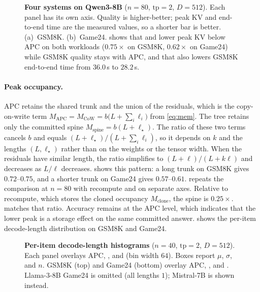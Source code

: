 \fi

\begin{figure}[t]
\centering
\resizebox{\columnwidth}{!}{}
\caption{\textbf{Four systems on Qwen3-8B} ($n{=}80$, $\mathrm{tp}{=}2$, $D{=}512$).
Each panel has its own axis. Quality is higher-better; peak KV and end-to-end time are the measured values, so a shorter bar is better.
(a)~GSM8K. (b)~Game24.
 shows that \sys and \plus lower peak KV below APC on both workloads ($0.75\times$ on GSM8K, $0.62\times$ on Game24) while GSM8K quality stays with APC, and that \plus also lowers GSM8K end-to-end time from $36.0$\,s to $28.2$\,s.}
\label{fig:eval-radar}
\end{figure}

\paragraph{Peak occupancy.}
APC retains the shared trunk and the union of the residuals, which is the copy-on-write term $M_{\mathrm{APC}}=M_{\mathrm{CoW}}=b\bigl(L+\sum_i\ell_i\bigr)$ from \eqref{eq:mem}. The tree retains only the committed spine $M_{\mathrm{spine}}=b(L+\ell_\star)$.
The ratio of these two terms cancels $b$ and equals $(L+\ell_\star)/(L+\sum_i\ell_i)$, so it depends on $k$ and the lengths $(L,\ell_\star)$ rather than on the weights or the tensor width.
When the residuals have similar length, the ratio simplifies to $(L+\ell)/(L+k\ell)$ and decreases as $L/\ell$ decreases.
 shows this pattern: a long trunk on GSM8K gives $0.72$--$0.75$, and a shorter trunk on Game24 gives $0.57$--$0.61$.
 repeats the comparison at $n{=}80$ with recompute and \plus on separate axes.
Relative to recompute, which stores the cloned occupancy $M_{\mathrm{clone}}$, the spine is $0.25\times$.
\plus matches that ratio.
Accuracy remains at the APC level, which indicates that the lower peak is a storage effect on the same committed answer.
 shows the per-item decode-length distribution on GSM8K and Game24.

\begin{figure}[t]
\centering
\resizebox{\textwidth}{!}{}
\caption{\textbf{Per-item decode-length histograms} ($n{=}40$, $\mathrm{tp}{=}2$, $D{=}512$).
Each panel overlays APC, \sys, and \plus (bin width $64$).
Boxes report $\mu$, $\sigma$, and $n$.
GSM8K (top) and Game24 (bottom) overlay APC, \sys, and \plus.
Llama-3-8B Game24 is omitted (all lengths $1$); Mistral-7B is shown instead.}
\label{fig:eval-hist}
\end{figure}


